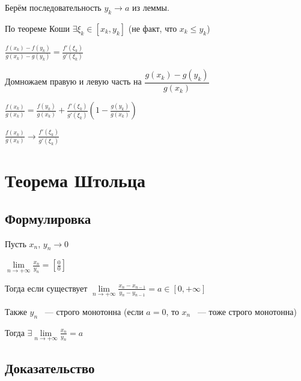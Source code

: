 \documentclass{article}
\begin{document}
			Берём последовательность $y_k \rightarrow a$ из леммы.
			
			По теореме Коши $\exists \xi_k \in [x_k, y_k]$ (не факт, что $x_k \leq y_k$)
			
			$\frac{f(x_k) - f(y_k)}{g(x_k) - g(y_k)} = \frac{f'(\xi_k)}{g'(\xi_k)}$
			
			Домножаем правую и левую часть на $\dfrac{g(x_k) - g(y_k)}{g(x_k)}$
			
			$\frac{f(x_k)}{g(x_k)} = \frac{f(y_k)}{g(x_k)} + \frac{f'(\xi_k)}{g'(\xi_k)} \left( 1 - \frac{g(y_k)}{g(x_k)} \right)$
			
			$\frac{f(x_k)}{g(x_k)} \rightarrow \frac{f'(\xi_k)}{g'(\xi_k)}$
			
	\newpage
	
	\section{Теорема Штольца}
	
		\subsection{Формулировка}
		
			Пусть $x_n$, $y_n \rightarrow 0$
			
			$\lim\limits_{n \rightarrow +\infty} \frac{x_n}{y_n} = \left[ \frac{0}{0} \right]$
			
			Тогда если существует $\lim\limits_{n \rightarrow +\infty} \frac{x_n - x_{n - 1}}{y_n - y_{n - 1}} = a \in [0, +\infty]$
			
			Также $y_n$ ~--- строго монотонна (если $a = 0$, то $x_n$ ~--- тоже строго монотонна)
			
			Тогда $\exists \lim\limits_{n \rightarrow +\infty} \frac{x_n}{y_n} = a$
			
		\subsection{Доказательство}
		
\end{document}
